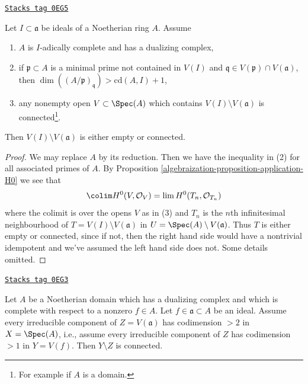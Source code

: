 \begin{lemma}[Connected]
\label{algebraization-lemma-connected}
\href{https://stacks.math.columbia.edu/tag/0EG5}{\texttt{Stacks tag 0EG5}}

Let $I \subset \mathfrak a$ be ideals of a Noetherian ring $A$.
Assume
\begin{enumerate}
\item $A$ is $I$-adically complete and has a dualizing complex,
\item if $\mathfrak p \subset A$ is a minimal prime not contained
in $V(I)$ and $\mathfrak q \in V(\mathfrak p) \cap V(\mathfrak a)$, then
$\dim((A/\mathfrak p)_\mathfrak q) > \text{cd}(A, I) + 1$,
\item any nonempty open $V \subset \Spec(A)$ which contains
$V(I) \setminus V(\mathfrak a)$ is connected\footnote{For example
if $A$ is a domain.}.
\end{enumerate}
Then $V(I) \setminus V(\mathfrak a)$ is either empty or connected.
\end{lemma}

\begin{proof}

We may replace $A$ by its reduction. Then we have the inequality
in (2) for all associated primes of $A$. By
Proposition \ref{algebraization-proposition-application-H0} we see that
$$
\colim H^0(V, \mathcal{O}_V) = \lim H^0(T_n, \mathcal{O}_{T_n})
$$
where the colimit is over the opens $V$ as in (3) and $T_n$ is the
$n$th infinitesimal neighbourhood of $T = V(I) \setminus V(\mathfrak a)$
in $U = \Spec(A) \setminus V(\mathfrak a)$. Thus $T$ is either empty
or connected, since if not, then the right hand side would have a
nontrivial idempotent and we've assumed the left hand side does not.
Some details omitted.
\end{proof}

\begin{lemma}[H0]
\label{algebraization-lemma-H0}
\href{https://stacks.math.columbia.edu/tag/0EG3}{\texttt{Stacks tag 0EG3}}

Let $A$ be a Noetherian domain which has a dualizing complex
and which is complete with respect to a nonzero $f \in A$.
Let $f \in \mathfrak a \subset A$ be an ideal.
Assume every irreducible component of $Z = V(\mathfrak a)$
has codimension $> 2$ in $X = \Spec(A)$, i.e., assume every
irreducible component of $Z$ has codimension $> 1$ in $Y = V(f)$.
Then $Y \setminus Z$ is connected.
\end{lemma}

